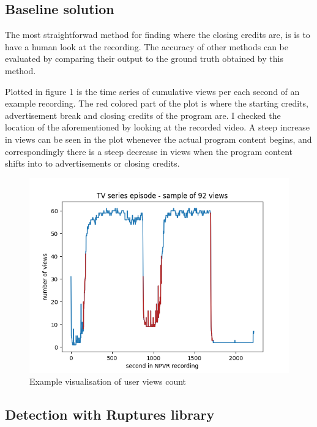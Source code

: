 \subsection{Baseline solution} \label{subsec:baseline}

The most straightforwad method for finding where the closing credits are, is is to have a human look at the recording. The accuracy of other methods can be evaluated by comparing their output to the ground truth obtained by this method.

Plotted in figure 1 is the time series of cumulative views per each second of an example recording. The red colored part of the plot is where the starting credits, advertisement break and closing credits of the program are. I checked the location of the aforementioned by looking at the recorded video. A steep increase in views can be seen in the plot whenever the actual program content begins, and correspondingly there is a steep decrease in views when the program content shifts into to advertisements or closing credits.

\begin{figure}[H]
    \centering
    \includegraphics[width=1\textwidth]{../plots/episode.png}
    \caption{Example visualisation of user views count}
    \label{fig:intro_ads_outro}
    \end{figure}

\subsection{Detection with Ruptures library} \label{subsec:solution}


